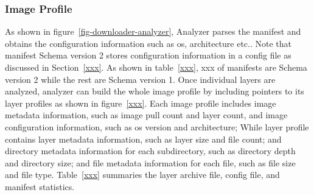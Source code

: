 \subsubsection{Image Profile}

As shown in figure~\ref{fig-downloader-analyzer}, Analyzer parses the manifest and obtains the configuration information such as os, architecture etc..
%
Note that manifest Schema version 2 stores configuration information in a config file as discussed in Section~\ref{xxx}.
%
As shown in table~\ref{xxx}, xxx of manifests are Schema version 2 while the rest are Schema version 1. 
%
Once individual layers are analyzed, analyzer can build the whole image profile by including pointers to its layer profiles as shown in figure~\ref{xxx}. Each image profile includes image metadata information, such as image pull count and layer count, and image configuration information, such as os version and architecture; While layer profile contains layer metadata information, such as layer size and file count; and directory metadata information for each subdirectory, such as directory depth and directory size; and file metadata information for each file, such as file size and file type.
%
Table~\ref{xxx} summaries the layer archive file, config file, and manifest statistics.



